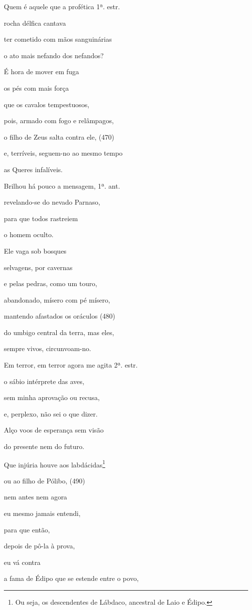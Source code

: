 Quem é aquele que a profética 1ª. estr.

rocha délfica cantava

ter cometido com mãos sanguinárias

o ato mais nefando dos nefandos?

É hora de mover em fuga

os pés com mais força

que os cavalos tempestuosos,

pois, armado com fogo e relâmpagos,

o filho de Zeus salta contra ele, (470)

e, terríveis, seguem-no ao mesmo tempo

as Queres infalíveis.

Brilhou há pouco a mensagem, 1ª. ant.

revelando-se do nevado Parnaso,

para que todos rastreiem

o homem oculto.

Ele vaga sob bosques

selvagens, por cavernas

e pelas pedras, como um touro,

abandonado, mísero com pé mísero,

mantendo afastados os oráculos (480)

do umbigo central da terra, mas eles,

sempre vivos, circunvoam-no.

Em terror, em terror agora me agita 2ª. estr.

o sábio intérprete das aves,

sem minha aprovação ou recusa,

e, perplexo, não sei o que dizer.

Alço voos de esperança sem visão

do presente nem do futuro.

Que injúria houve aos labdácidas\footnote{Ou seja, os descendentes de
  Lábdaco, ancestral de Laio e Édipo.}

ou ao filho de Pólibo, (490)

nem antes nem agora

eu mesmo jamais entendi,

para que então,

depois de pô-la à prova,

eu vá contra

a fama de Édipo que se estende entre o povo,

